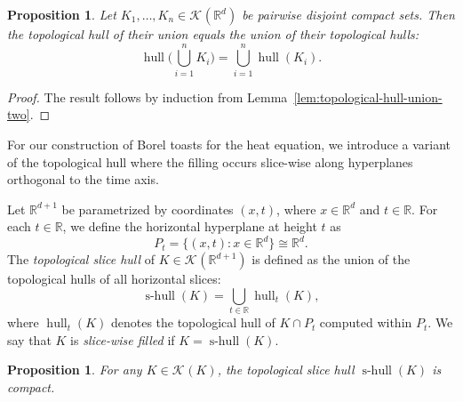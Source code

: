 \documentclass[12pt]{paper}
\numberwithin{equation}{section}
\theoremstyle{plain}
\newtheorem{proposition}[theorem]{Proposition}
\theoremstyle{definition}
\newcommand{\R}{\mathbb{R}}
\newcommand{\Rd}{\mathbb{R}^{d}}
\newcommand{\vietoris}[2][]{\mathcal{K}_{#1}(#2)}
\DeclareMathOperator{\hull}{\mathrm{hull}}
\DeclareMathOperator{\shull}{\mathrm{s-hull}}
\begin{document}
\begin{proposition}
  \label{prop:topological-hull-finite-union}
  Let \(K_{1}, \ldots, K_{n} \in \vietoris{\Rd}\) be pairwise disjoint compact sets. Then the
  topological hull of their union equals the union of their topological hulls:
  \[ \hull\bigl(\bigcup_{i=1}^{n}K_{i}\bigr) = \bigcup_{i=1}^{n}\hull(K_{i}). \]
\end{proposition}

\begin{proof}
  The result follows by induction from Lemma~\ref{lem:topological-hull-union-two}.
\end{proof}

For our construction of Borel toasts for the heat equation, we introduce a variant of the
topological hull where the filling occurs slice-wise along hyperplanes orthogonal to the time axis.

Let \(\R^{d+1}\) be parametrized by coordinates \((x,t)\), where \(x \in \Rd\) and
\(t \in \R\). For each \(t \in \R\), we define the horizontal hyperplane at height \(t\) as
\[ P_{t} = \{(x,t): x \in \Rd\} \cong \Rd. \]
The \emph{topological slice hull} of \(K \in \vietoris{\R^{d+1}} \) is defined as the union of the
topological hulls of all horizontal slices:
\[ \shull(K) = \bigcup_{t \in \R} \hull_{t}(K),\]
where \(\hull_{t}(K)\) denotes the topological hull of \(K\cap P_{t}\) computed within \(P_{t}\). We
say that \(K\) is \emph{slice-wise filled} if \(K = \shull(K)\).

\begin{proposition}
  \label{prop:slice-hull-compact}
  For any \(K \in \vietoris{K}\), the topological slice hull \(\shull(K)\) is compact.
\end{proposition}
\end{document}

